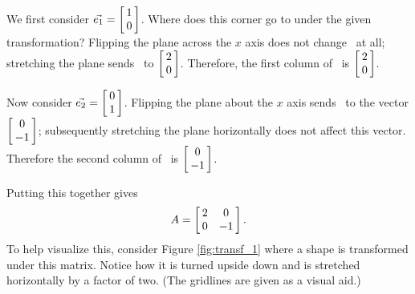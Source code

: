 {We first consider $\veone = \bmx{c}1\\0\emx$. Where does this corner go to under the given transformation? Flipping the plane across the $x$ axis does not change \veone\ at all; stretching the plane sends \veone\ to $\bmx{c}2\\0\emx$. Therefore, the first column of \tta\ is $\bmx{c}2\\0\emx$.

Now consider $\vetwo = \bmx{c}0\\1\emx$. Flipping the plane about the $x$ axis sends \vetwo\ to the vector $\bmx{c}0\\-1\emx$; subsequently stretching the plane horizontally does not affect this vector. Therefore the second column of \tta\ is $\bmx{c}0\\-1\emx$. 

Putting this together gives $$\tta = \bmx{cc}2&0\\0&-1\emx.$$ To help visualize this, consider Figure \ref{fig:transf_1} where a shape is transformed under this matrix. Notice how it is turned upside down and is stretched horizontally by a factor of two. (The gridlines are given as a visual aid.)

\begin{myfigure}
\begin{center}
\end{center}
\label{fig:transf_1}
\end{myfigure}
\baselineskip}\\

